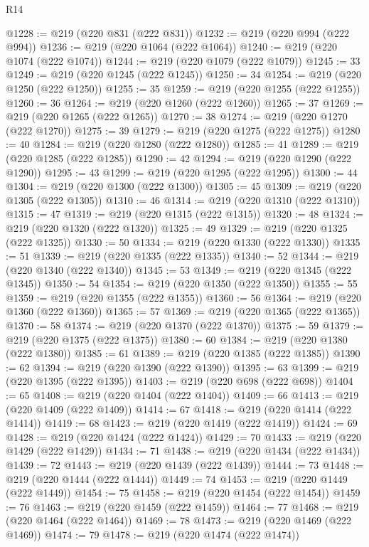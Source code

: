 \begin{lexlean}{R14}
\begin{coremodule}
@1228 := @219 (@220 @831 (@222 @831))
@1232 := @219 (@220 @994 (@222 @994))
@1236 := @219 (@220 @1064 (@222 @1064))
@1240 := @219 (@220 @1074 (@222 @1074))
@1244 := @219 (@220 @1079 (@222 @1079))
@1245 := 33
@1249 := @219 (@220 @1245 (@222 @1245))
@1250 := 34
@1254 := @219 (@220 @1250 (@222 @1250))
@1255 := 35
@1259 := @219 (@220 @1255 (@222 @1255))
@1260 := 36
@1264 := @219 (@220 @1260 (@222 @1260))
@1265 := 37
@1269 := @219 (@220 @1265 (@222 @1265))
@1270 := 38
@1274 := @219 (@220 @1270 (@222 @1270))
@1275 := 39
@1279 := @219 (@220 @1275 (@222 @1275))
@1280 := 40
@1284 := @219 (@220 @1280 (@222 @1280))
@1285 := 41
@1289 := @219 (@220 @1285 (@222 @1285))
@1290 := 42
@1294 := @219 (@220 @1290 (@222 @1290))
@1295 := 43
@1299 := @219 (@220 @1295 (@222 @1295))
@1300 := 44
@1304 := @219 (@220 @1300 (@222 @1300))
@1305 := 45
@1309 := @219 (@220 @1305 (@222 @1305))
@1310 := 46
@1314 := @219 (@220 @1310 (@222 @1310))
@1315 := 47
@1319 := @219 (@220 @1315 (@222 @1315))
@1320 := 48
@1324 := @219 (@220 @1320 (@222 @1320))
@1325 := 49
@1329 := @219 (@220 @1325 (@222 @1325))
@1330 := 50
@1334 := @219 (@220 @1330 (@222 @1330))
@1335 := 51
@1339 := @219 (@220 @1335 (@222 @1335))
@1340 := 52
@1344 := @219 (@220 @1340 (@222 @1340))
@1345 := 53
@1349 := @219 (@220 @1345 (@222 @1345))
@1350 := 54
@1354 := @219 (@220 @1350 (@222 @1350))
@1355 := 55
@1359 := @219 (@220 @1355 (@222 @1355))
@1360 := 56
@1364 := @219 (@220 @1360 (@222 @1360))
@1365 := 57
@1369 := @219 (@220 @1365 (@222 @1365))
@1370 := 58
@1374 := @219 (@220 @1370 (@222 @1370))
@1375 := 59
@1379 := @219 (@220 @1375 (@222 @1375))
@1380 := 60
@1384 := @219 (@220 @1380 (@222 @1380))
@1385 := 61
@1389 := @219 (@220 @1385 (@222 @1385))
@1390 := 62
@1394 := @219 (@220 @1390 (@222 @1390))
@1395 := 63
@1399 := @219 (@220 @1395 (@222 @1395))
@1403 := @219 (@220 @698 (@222 @698))
@1404 := 65
@1408 := @219 (@220 @1404 (@222 @1404))
@1409 := 66
@1413 := @219 (@220 @1409 (@222 @1409))
@1414 := 67
@1418 := @219 (@220 @1414 (@222 @1414))
@1419 := 68
@1423 := @219 (@220 @1419 (@222 @1419))
@1424 := 69
@1428 := @219 (@220 @1424 (@222 @1424))
@1429 := 70
@1433 := @219 (@220 @1429 (@222 @1429))
@1434 := 71
@1438 := @219 (@220 @1434 (@222 @1434))
@1439 := 72
@1443 := @219 (@220 @1439 (@222 @1439))
@1444 := 73
@1448 := @219 (@220 @1444 (@222 @1444))
@1449 := 74
@1453 := @219 (@220 @1449 (@222 @1449))
@1454 := 75
@1458 := @219 (@220 @1454 (@222 @1454))
@1459 := 76
@1463 := @219 (@220 @1459 (@222 @1459))
@1464 := 77
@1468 := @219 (@220 @1464 (@222 @1464))
@1469 := 78
@1473 := @219 (@220 @1469 (@222 @1469))
@1474 := 79
@1478 := @219 (@220 @1474 (@222 @1474))

\end{coremodule}
\end{lexlean}
